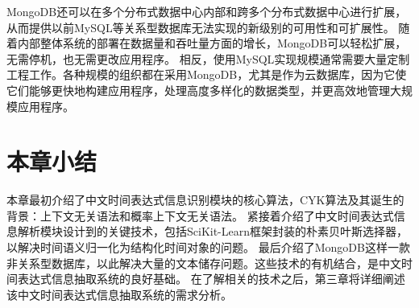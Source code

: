 MongoDB还可以在多个分布式数据中心内部和跨多个分布式数据中心进行扩展，从而提供以前MySQL等关系型数据库无法实现的新级别的可用性和可扩展性。
随着内部整体系统的部署在数据量和吞吐量方面的增长，MongoDB可以轻松扩展，无需停机，也无需更改应用程序。
相反，使用MySQL实现规模通常需要大量定制工程工作。各种规模的组织都在采用MongoDB，尤其是作为云数据库，因为它使它们能够更快地构建应用程序，处理高度多样化的数据类型，并更高效地管理大规模应用程序。


\section{本章小结}

本章最初介绍了中文时间表达式信息识别模块的核心算法，CYK算法及其诞生的背景：上下文无关语法和概率上下文无关语法。
紧接着介绍了中文时间表达式信息解析模块设计到的关键技术，包括SciKit-Learn框架封装的朴素贝叶斯选择器，以解决时间语义归一化为结构化时间对象的问题。
最后介绍了MongoDB这样一款非关系型数据库，以此解决大量的文本储存问题。这些技术的有机结合，是中文时间表达式信息抽取系统的良好基础。
在了解相关的技术之后，第三章将详细阐述该中文时间表达式信息抽取系统的需求分析。
